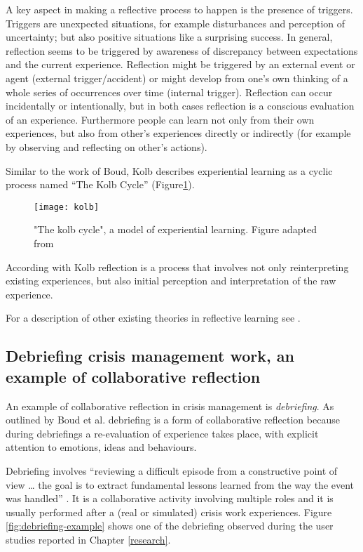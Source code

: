 A key aspect in making a reflective process to happen is the presence of triggers. Triggers are unexpected situations, for example disturbances and perception of uncertainty; but also positive situations like a surprising success. In general, reflection seems to be triggered by awareness of discrepancy between expectations and the current experience. Reflection might be triggered by an external event or agent (external trigger/accident) or might develop from one's own thinking of a whole series of occurrences over time (internal trigger). Reflection can occur incidentally or intentionally, but in both cases reflection is a conscious evaluation of an experience. Furthermore people can learn not only from their own experiences, but also from other's experiences directly or indirectly (for example by observing and reflecting on other's actions).

Similar to the work of Boud, Kolb describes experiential learning as a cyclic process named ``The Kolb Cycle'' (Figure\ref{fig:kolb-model}).

\begin{figure}
	[tbh] \centering 
	\texttt{[image: kolb]} \caption{"The kolb cycle", a model of experiential learning. Figure adapted from \protect\autocite{kolb1984organizational}} \label{fig:kolb-model} 
\end{figure}

According with Kolb \autocite*{kolb1984experiential} reflection is a process that involves not only reinterpreting existing experiences, but also initial perception and interpretation of the raw experience.

For a description of other existing theories in reflective learning see \autocite{WoodDaudelin199636}.

\subsection{Debriefing crisis management work, an example of collaborative reflection}\label{debriefing-crisis-management-work-an-example-of-collaborative-reflection}

An example of collaborative reflection in crisis management is \emph{debriefing}. As outlined by Boud et al. \autocite*{boud1985reflection} debriefing is a form of collaborative reflection because during debriefings a re-evaluation of experience takes place, with explicit attention to emotions, ideas and behaviours.

Debriefing involves ``reviewing a difficult episode from a constructive point of view \ldots{} the goal is to extract fundamental lessons learned from the way the event was handled'' \autocite{Lagadec:1997js}. It is a collaborative activity involving multiple roles and it is usually performed after a (real or simulated) crisis work experiences. Figure \ref{fig:debriefing-example} shows one of the debriefing observed during the user studies reported in Chapter \ref{research}.

